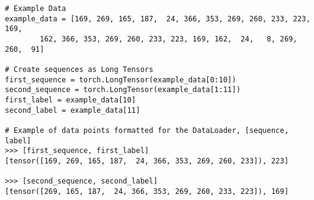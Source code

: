 \begin{lstlisting}
# Example Data
example_data = [169, 269, 165, 187,  24, 366, 353, 269, 260, 233, 223, 169,
        162, 366, 353, 269, 260, 233, 223, 169, 162,  24,   8, 269, 260,  91]

# Create sequences as Long Tensors
first_sequence = torch.LongTensor(example_data[0:10])
second_sequence = torch.LongTensor(example_data[1:11])
first_label = example_data[10]
second_label = example_data[11]

# Example of data points formatted for the DataLoader, [sequence, label]
>>> [first_sequence, first_label]
[tensor([169, 269, 165, 187,  24, 366, 353, 269, 260, 233]), 223]

>>> [second_sequence, second_label]
[tensor([269, 165, 187,  24, 366, 353, 269, 260, 233, 223]), 169]
\end{lstlisting}


